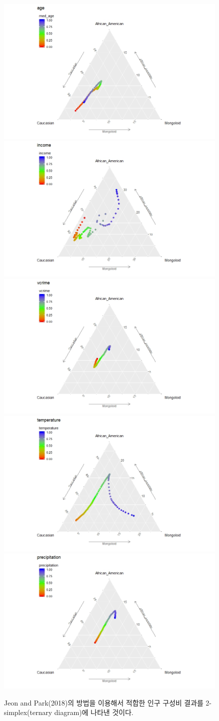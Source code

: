 \begin{figure}
\centering
\includegraphics[width=0.48\linewidth]{figs/p_age.jpeg}
\hspace{.005\linewidth} 
\includegraphics[width=0.48\linewidth]{figs/p_income.jpeg}
\\[.5\baselineskip]
\includegraphics[width=0.48\linewidth]{figs/p_vcrime.jpeg}
\hspace{.005\linewidth} 
\includegraphics[width=0.48\linewidth]{figs/p_temperature.jpeg}
\\[.5\baselineskip]
\includegraphics[width=0.48\linewidth]{figs/p_precipitation.jpeg}
\caption{Jeon and Park(2018)의 방법을 이용해서 적합한 인구 구성비 결과를 2-simplex(ternary diagram)에 나타낸 것이다.}
\end{figure}

